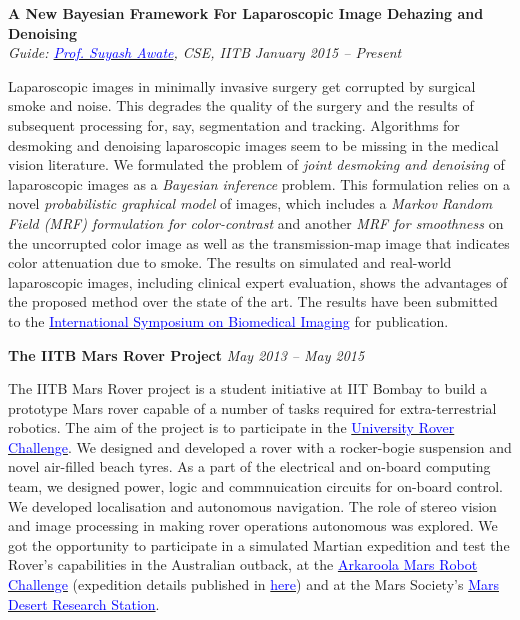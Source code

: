 \documentclass[margin,line]{res}
\newenvironment{list1}{
  \begin{list}{\ding{113}}{%
      \setlength{\itemsep}{0in}
      \setlength{\parsep}{0in} \setlength{\parskip}{0in}
      \setlength{\topsep}{0in} \setlength{\partopsep}{0in} 
      \setlength{\leftmargin}{0.17in}}}{\end{list}}
\begin{document}
\begin{resume}
{\bf A New Bayesian Framework For Laparoscopic Image Dehazing and Denoising} \\
{\em Guide: \href{https://www.cse.iitb.ac.in/~suyash}{\textcolor{blue}{Prof. Suyash Awate}}, CSE, IITB} \hfill {\it January 2015 -- Present} \\
\vspace*{-.13in}
\begin{list1}
\item[]
Laparoscopic images in minimally invasive surgery get corrupted by surgical smoke and noise. This degrades the quality of the surgery and the results of subsequent processing for, say, segmentation and tracking. Algorithms for desmoking and denoising laparoscopic images seem to be missing in the medical vision literature. We formulated the problem of {\em joint desmoking and denoising} of laparoscopic images as a {\em Bayesian inference} problem. This formulation relies on a novel {\em probabilistic graphical model} of images, which includes a {\em Markov Random Field (MRF) formulation for color-contrast} and another {\em MRF for smoothness} on the uncorrupted color image as well as the transmission-map image that indicates color attenuation due to smoke. The results on simulated and real-world laparoscopic images, including clinical expert evaluation, shows the advantages of the proposed method over the state of the art. The results have been submitted to the \href{http://biomedicalimaging.org/2016/}{\textcolor{blue} {International Symposium on Biomedical Imaging}} for publication.
\end{list1}

{\bf The IITB Mars Rover Project}
\hfill {\it May 2013 -- May 2015} \\
\vspace*{-.13in}
\begin{list1}
\item[]
The IITB Mars Rover project is a student initiative at IIT Bombay to build a prototype Mars rover capable of a number of tasks required for extra-terrestrial robotics. The aim of the project is to participate in the \href{urc.marssociety.org/}{\textcolor{blue} {University Rover Challenge}}. We designed and developed a rover with a rocker-bogie suspension and novel air-filled beach tyres. As a part of the electrical and on-board computing team, we designed power, logic and commnuication circuits for on-board control. We developed localisation and autonomous navigation. The role of stereo vision and image processing in making rover operations autonomous was explored. We got the opportunity to participate in a simulated Martian expedition and test the Rover's capabilities in the Australian outback, at the \href{http://marssociety.org.au/article/arkaroola-mars-robot-challenge-spaceward-bound-expedition}{\textcolor{blue} {Arkaroola Mars Robot Challenge}} (expedition details published in \href{http://www.nssa.com.au/14asrc/14ASRC-proceedings.zip}{\textcolor{blue} {here}}) and at the Mars Society's \href{http://mdrs.marssociety.org/}{\textcolor{blue} {Mars Desert Research Station}}.
\end{list1}


\end{resume}
\end{document}
